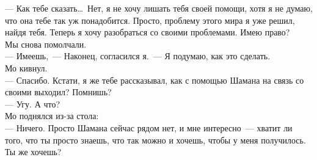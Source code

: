 --- Как тебе сказать\ldots\ Нет, я не хочу лишать тебя своей помощи, хотя я не 
думаю, что она тебе так уж понадобится. Просто, проблему этого мира я уже решил, найдя 
тебя. Теперь я хочу разобраться со своими проблемами. Имею право?\\
Мы снова помолчали.\\
--- Имеешь,~--- Наконец, согласился я.~--- Я подумаю, как это сделать.\\
Мо кивнул.\\
--- Спасибо. Кстати, я же тебе рассказывал, как с помощью Шамана на связь со 
своими выходил? Помнишь?\\
--- Угу. А что?\\
Мо поднялся из-за стола: \\
--- Ничего. Просто Шамана сейчас рядом нет, и мне интересно~--- хватит ли того, 
что ты просто знаешь, что так можно и хочешь, чтобы у меня получилось. Ты же хочешь?

